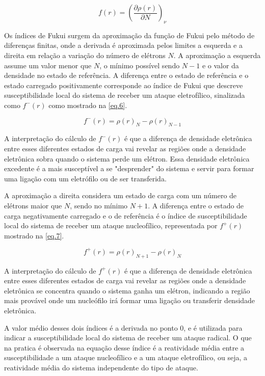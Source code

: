 \documentclass[a4paper,11pt]{refart}
\begin{document}
\begin{equation}
f(r) = \left(\frac{\partial \rho(r)}{\partial N} \right)_\nu
\label{eq.5}
\end{equation}

Os índices de Fukui surgem da aproximação da função de Fukui pelo método de diferenças finitas, onde a derivada é aproximada pelos limites a esquerda e a direita em relação a variação do número de elétrons $N$. A aproximação a esquerda assume um valor menor que $N$, o mínimo possível sendo $N-1$ e o valor da densidade no estado de referência. A diferença entre o estado de referência e o estado carregado positivamente corresponde ao índice de Fukui que descreve susceptibilidade local do sistema de receber um ataque eletrofílico, sinalizada como $f^{-}(r)$ como mostrado na \autoref{eq.6}.

\begin{equation}
f^{-}(r) = \rho(r)_{N} -\rho(r)_{N-1}
\label{eq.6}
\end{equation}

A interpretação do cálculo de  $f^{-}(r)$ é que a diferença de densidade eletrônica entre esses diferentes estados de carga vai revelar as regiões onde a densidade eletrônica sobra quando o sistema perde um elétron. Essa densidade eletrônica excedente é a mais susceptível a se "desprender" do sistema e servir para formar uma ligação com um eletrófilo ou de ser transferida. 

A aproximação a direita considera um estado de carga com um número de elétrons maior que $N$, sendo no mínimo $N+1$. A diferença entre o estado de carga negativamente carregado e o de referência é o índice de susceptibilidade local do sistema de receber um ataque nucleofílico, representada por $f^{+}(r)$ mostrado na \autoref{eq.7}.

\begin{equation}
f^{+}(r) = \rho(r)_{N+1} -\rho(r)_{N}
\label{eq.7}
\end{equation}

A interpretação do cálculo de  $f^{+}(r)$ é que a diferença de densidade eletrônica entre esses diferentes estados de carga vai revelar as regiões onde a densidade eletrônica se concentra quando o sistema ganha um elétron, indicando a região mais provável onde um nucleófilo irá formar uma ligação ou transferir densidade eletrônica.   

A valor médio desses dois índices é a derivada no ponto 0, e é utilizada para indicar a susceptibilidade local do sistema de receber um ataque radical. O que na pratica é observada na equação desse índice é a reatividade média entre a susceptibilidade a um ataque nucleofílico e a um ataque eletrofílico, ou seja, a reatividade média do sistema independente do tipo de ataque. 
\end{document}
